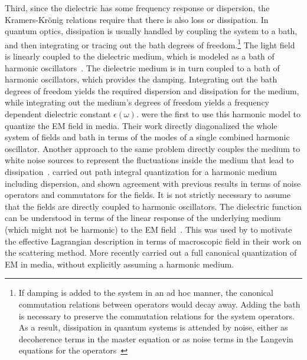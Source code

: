 Third, since the dielectric has some frequency response or dispersion, the Kramers-Kr\"onig relations 
require that there is also loss or dissipation.  
In  quantum optics, dissipation is usually handled by coupling the system to a bath, and then
integrating or tracing out the bath degrees of freedom.\footnote{If damping is added to the system in an ad hoc
manner, the canonical commutation relations between operators would decay away.
Adding the bath is necessary to preserve the commutation relations for the system operators.
 As a result, dissipation in quantum systems is attended by noise, 
either as decoherence terms in the master equation or as noise terms in the Langevin equations for the operators~\citep{GardinerZoller2004}}
The light field is linearly coupled to the dielectric medium, which is modeled
as a bath of harmonic oscillators~\citep{Huttner1992,Dung1998,Bechler1999}.
The dielectric medium is in turn coupled to a bath of harmonic oscillators, which provides the damping.
Integrating out the bath degrees of freedom yields the required dispersion and dissipation for the medium, 
while integrating out the medium's degrees of freedom yields a frequency dependent dielectric constant $\epsilon(\omega)$.
\citet{Huttner1992} were the first to use this harmonic model to quantize the EM field in media. Their
work directly diagonalized the whole system of fields and bath in terms of the modes of 
a single combined harmonic oscillator.
Another approach to the same problem directly couples the medium to white noise sources to represent the fluctuations 
inside the medium that lead to dissipation~\citep{Scheel1998,Dung1998,Tip2001}.
\citet{Bechler1999,Bechler2006} carried out path integral quantization for a harmonic medium 
including dispersion, and shown agreement with previous results in terms 
of noise operators and commutators for the fields.  
It is not strictly necessary to assume that the fields are directly coupled to harmonic oscillators. 
The dielectric function can be understood in terms of the linear response of the underlying 
medium (which might not be harmonic) to the EM field~\citep{Altland2011}.  
This was used by \citet{Rahi2009} to motivate the effective Lagrangian description in terms of macroscopic field in their 
work on the scattering method.  
More recently \citet{Philbin2010} carried out a full canonical quantization of EM in media, without explicitly 
assuming a harmonic medium.


